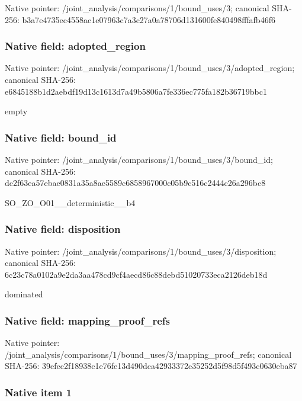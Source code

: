 \documentclass[10pt,a4paper]{article}
\begin{document}
Native pointer: /joint\_analysis/comparis\allowbreak{}ons/1/bound\_uses/3; canonical SHA-256: b3a7e4735ec4558ac1e07963\allowbreak{}c7a3c27a0a78706d131600fe\allowbreak{}840498fffafb46f6



\subsubsection{Native field: adopted\_region}


Native pointer: /joint\_analysis/comparis\allowbreak{}ons/1/bound\_uses/3/adopt\allowbreak{}ed\_region; canonical SHA-256: e6845188b1d2aebdf19d13c1\allowbreak{}613d7a49b5806a7fe336ec77\allowbreak{}5fa182b36719bbc1


empty


\subsubsection{Native field: bound\_id}


Native pointer: /joint\_analysis/comparis\allowbreak{}ons/1/bound\_uses/3/bound\allowbreak{}\_id; canonical SHA-256: dc2f63ea57ebae0831a35a8a\allowbreak{}e5589c6858967000c05b9c51\allowbreak{}6c2444c26a296bc8


SO\_ZO\_O01\_\_deterministic\_\_b4


\subsubsection{Native field: disposition}


Native pointer: /joint\_analysis/comparis\allowbreak{}ons/1/bound\_uses/3/dispo\allowbreak{}sition; canonical SHA-256: 6c23c78a0102a9e2da3aa478\allowbreak{}cd9cf4aecd86c88debd51020\allowbreak{}733eca2126deb18d


dominated


\subsubsection{Native field: mapping\_proof\_refs}


Native pointer: /joint\_analysis/comparis\allowbreak{}ons/1/bound\_uses/3/mappi\allowbreak{}ng\_proof\_refs; canonical SHA-256: 39efec2f18938c1e76fe13d4\allowbreak{}90dca42933372e35252d5f98\allowbreak{}d5f493c0630eba87



\subsubsection{Native item 1}
\end{document}
